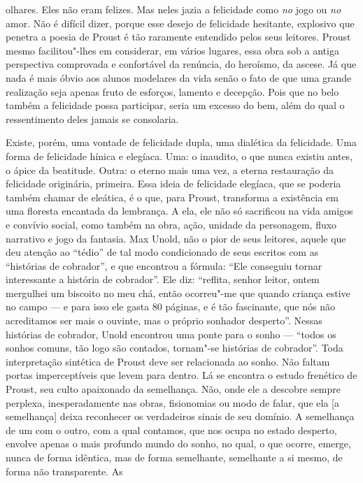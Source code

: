 olhares. Eles não eram felizes. Mas neles jazia a felicidade como
\emph{no} jogo ou \emph{no} amor. Não é difícil dizer, porque esse
desejo de felicidade hesitante, explosivo que penetra a poesia de
Proust é tão raramente entendido pelos seus leitores. Proust mesmo
facilitou"-lhes em considerar, em vários lugares, essa obra sob a
antiga perspectiva comprovada e confortável da renúncia, do heroísmo, da
ascese. Já que nada é mais óbvio aos alunos modelares da vida senão o
fato de que uma grande realização seja apenas fruto de esforços, lamento
e decepção. Pois que no belo também a felicidade possa participar, seria
um excesso do bem, além do qual o ressentimento deles jamais se
consolaria.

Existe, porém, uma vontade de felicidade dupla, uma dialética da
felicidade. Uma forma de felicidade hínica e elegíaca. Uma: o inaudito,
o que nunca existiu antes, o ápice da beatitude. Outra: o eterno mais
uma vez, a eterna restauração da felicidade originária, primeira. Essa
ideia de felicidade elegíaca, que se poderia também chamar de eleática,
é o que, para Proust, transforma a existência em uma floresta encantada
da lembrança. A ela, ele não só sacrificou na vida amigos e convívio
social, como também na obra, ação, unidade da personagem, fluxo
narrativo e jogo da fantasia. Max Unold, não o pior de seus leitores,
aquele que deu atenção ao ``tédio'' de tal modo condicionado de seus
escritos com as ``histórias de cobrador'', e que encontrou a fórmula:
``Ele conseguiu tornar interessante a história de cobrador''. Ele diz:
``reflita, senhor leitor, ontem mergulhei um biscoito no meu chá, então
ocorreu"-me que quando criança estive no campo --- e para isso ele gasta 80
páginas, e é tão fascinante, que nós não acreditamos ser mais o ouvinte,
mas o próprio sonhador desperto''. Nessas histórias de cobrador, Unold
encontrou uma ponte para o sonho --- ``todos os sonhos comuns, tão logo
são contados, tornam"-se histórias de cobrador''. Toda interpretação
sintética de Proust deve ser relacionada ao sonho. Não faltam portas
imperceptíveis que levem para dentro. Lá se encontra o estudo frenético
de Proust, seu culto apaixonado da semelhança. Não, onde ele a descobre
sempre perplexa, inesperadamente nas obras, fisionomias ou modo de
falar, que ela {[}a semelhança{]} deixa reconhecer os verdadeiros sinais
de seu domínio. A semelhança de um com o outro, com a qual contamos, que
nos ocupa no estado desperto, envolve apenas o mais profundo mundo do
sonho, no qual, o que ocorre, emerge, nunca de forma idêntica, mas de
forma semelhante, semelhante a si mesmo, de forma não transparente. As
